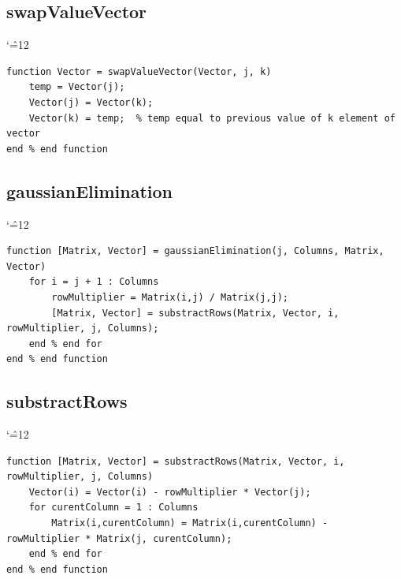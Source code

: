 \documentclass[12pt]{report}
\newenvironment{simplechar}{%
   \catcode`\^=12
}{}
\begin{document}
\subsection{swapValueVector}
\begin{simplechar}
\begin{lstlisting}
function Vector = swapValueVector(Vector, j, k)
    temp = Vector(j);
    Vector(j) = Vector(k);
    Vector(k) = temp;  % temp equal to previous value of k element of vector
end % end function
\end{lstlisting}
\end{simplechar}

\subsection{gaussianElimination}
\begin{simplechar}
\begin{lstlisting}
function [Matrix, Vector] = gaussianElimination(j, Columns, Matrix, Vector)
    for i = j + 1 : Columns
        rowMultiplier = Matrix(i,j) / Matrix(j,j);
        [Matrix, Vector] = substractRows(Matrix, Vector, i, rowMultiplier, j, Columns);
    end % end for
end % end function
\end{lstlisting}
\end{simplechar}

\subsection{substractRows}
\begin{simplechar}
\begin{lstlisting}
function [Matrix, Vector] = substractRows(Matrix, Vector, i, rowMultiplier, j, Columns)
    Vector(i) = Vector(i) - rowMultiplier * Vector(j);
    for curentColumn = 1 : Columns
        Matrix(i,curentColumn) = Matrix(i,curentColumn) - rowMultiplier * Matrix(j, curentColumn);
    end % end for
end % end function
\end{lstlisting}
\end{simplechar}

\newpage
\end{document}
